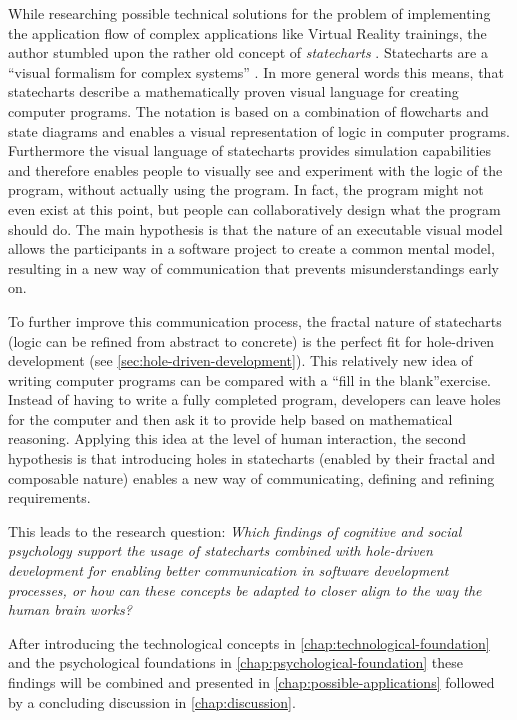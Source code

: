 While researching possible technical solutions for the problem of implementing the application flow of complex applications like Virtual Reality trainings, the author stumbled upon the rather old concept of \emph{statecharts} \autocite{harel_statecharts:_1987}. Statecharts are a ``visual formalism for complex systems'' \autocite{harel_statecharts:_1987}. In more general words this means, that statecharts describe a mathematically proven visual language for creating computer programs. The notation is based on a combination of flowcharts and state diagrams and enables a visual representation of logic in computer programs. Furthermore the visual language of statecharts provides simulation capabilities and therefore enables people to visually see and experiment with the logic of the program, without actually using the program. In fact, the program might not even exist at this point, but people can collaboratively design what the program should do. The main hypothesis is that the nature of an executable visual model allows the participants in a software project to create a common mental model, resulting in a new way of communication that prevents misunderstandings early on.

To further improve this communication process, the fractal nature of statecharts (logic can be refined from abstract to concrete) is the perfect fit for hole-driven development (see \cref{sec:hole-driven-development}). This relatively new idea of writing computer programs can be compared with a ``fill in the blank''exercise. Instead of having to write a fully completed program, developers can leave holes for the computer and then ask it to provide help based on mathematical reasoning. Applying this idea at the level of human interaction, the second hypothesis is that introducing holes in statecharts (enabled by their fractal and composable nature) enables a new way of communicating, defining and refining requirements.

This leads to the research question: \emph{Which findings of cognitive and social psychology support the usage of statecharts combined with hole-driven development for enabling better communication in software development processes, or how can these concepts be adapted to closer align to the way the human brain works?}

After introducing the technological concepts in \cref{chap:technological-foundation} and the psychological foundations in \cref{chap:psychological-foundation} these findings will be combined and presented in \cref{chap:possible-applications} followed by a concluding discussion in \cref{chap:discussion}.

